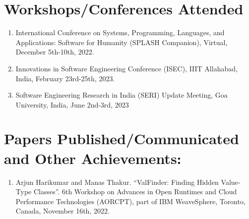 \documentclass[12 pt, a4paper]{article}
\begin{document}
\vskip 0.7cm
\section{Workshops/Conferences Attended}
\begin{enumerate}
\item International Conference on Systems, Programming, 
Languages, and Applications: Software for Humanity 
(SPLASH Companion), Virtual, December 5th-10th, 2022.
\item {} Innovations in Software Engineering Conference (ISEC), 
IIIT Allahabad, India, February 23rd-25th, 2023.
\item Software Engineering Research in India (SERI) Update Meeting, 
Goa University, India, June 2nd-3rd, 2023
\end{enumerate} 



\section{Papers Published/Communicated and Other Achievements:} 
\begin{enumerate}
\item Arjun Harikumar and Manas Thakur. “ValFinder: Finding Hidden Value-Type Classes”. 
6th Workshop on Advances in Open Runtimes and Cloud Performance Technologies (AORCPT), part of IBM WeaveSphere, Toronto, Canada, November 16th, 2022.
\end{enumerate} 


\clearpage


\end{document}
